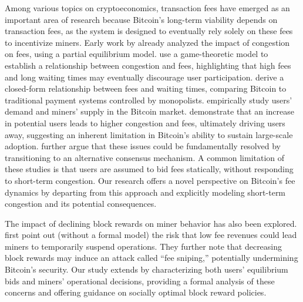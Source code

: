 \documentclass[12pt, letterpaper]{article}
\begin{document}
Among various topics on cryptoeconomics, transaction fees have emerged as an important area of research because Bitcoin's long-term viability depends on transaction fees, as the system is designed to eventually rely solely on these fees to incentivize miners. Early work by \citet{houy2014economics} already analyzed the impact of congestion on fees, using a partial equilibrium model. \citet{easley2019mining} use a game-theoretic model to establish a relationship between congestion and fees, highlighting that high fees and long waiting times may eventually discourage user participation. \citet{huberman2021monopoly} derive a closed-form relationship between fees and waiting times, comparing Bitcoin to traditional payment systems controlled by monopolists. \citet{ilk2021stability} empirically study users' demand and miners' supply in the Bitcoin market. \citet{hinzen2022bitcoin} demonstrate that an increase in potential users leads to higher congestion and fees, ultimately driving users away, suggesting an inherent limitation in Bitcoin's ability to sustain large-scale adoption. \citet{john2025proof} further argue that these issues could be fundamentally resolved by transitioning to an alternative consensus mechanism. A common limitation of these studies is that users are assumed to bid fees statically, without responding to short-term congestion. Our research offers a novel perspective on Bitcoin's fee dynamics by departing from this approach and explicitly modeling short-term congestion and its potential consequences.

The impact of declining block rewards on miner behavior has also been explored. \citet{carlsten2016instability} first point out (without a formal model) the risk that low fee revenues could lead miners to temporarily suspend operations. They further note that decreasing block rewards may induce an attack called ``fee sniping,'' potentially undermining Bitcoin’s security. Our study extends \citet{carlsten2016instability} by characterizing both users' equilibrium bids and miners' operational decisions, providing a formal analysis of these concerns and offering guidance on socially optimal block reward policies.
\end{document}
